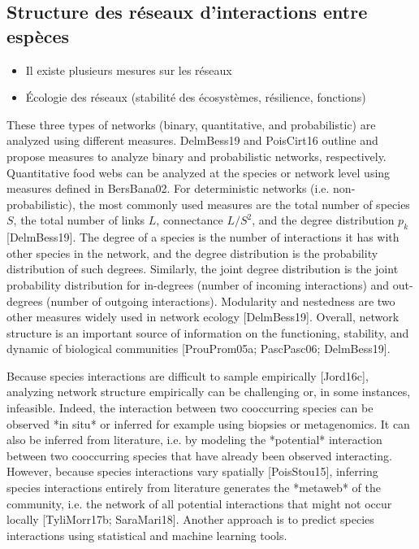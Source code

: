 \subsection{Structure des réseaux d'interactions entre espèces} 

\begin{itemize}
    \item Il existe plusieurs mesures sur les réseaux 
    \item Écologie des réseaux (stabilité des écosystèmes, résilience, fonctions)
\end{itemize}

These three types of networks (binary, quantitative, and probabilistic) are
analyzed using different measures. DelmBess19 and PoisCirt16 outline and
propose measures to analyze binary and probabilistic networks, respectively.
Quantitative food webs can be analyzed at the species or network level using
measures defined in BersBana02. For deterministic networks (i.e.
non-probabilistic), the most commonly used measures are the total number of
species $S$, the total number of links $L$, connectance $L/S^2$, and the degree
distribution $p_k$ [DelmBess19]. The degree of a species is the number of
interactions it has with other species in the network, and the degree
distribution is the probability distribution of such degrees. Similarly, the
joint degree distribution is the joint probability distribution for in-degrees
(number of incoming interactions) and out-degrees (number of outgoing
interactions). Modularity and nestedness are two other measures widely used in
network ecology [DelmBess19]. Overall, network structure is an important source
of information on the functioning, stability, and dynamic of biological
communities [ProuProm05a; PascPasc06; DelmBess19].

Because species interactions are difficult to sample empirically [Jord16c],
analyzing network structure empirically can be challenging or, in some
instances, infeasible. Indeed, the interaction between two cooccurring species
can be observed *in situ* or inferred for example using biopsies or
metagenomics. It can also be inferred from literature, i.e. by modeling the
*potential* interaction between two cooccurring species that have already been
observed interacting. However, because species interactions vary spatially
[PoisStou15], inferring species interactions entirely from literature generates
the *metaweb* of the community, i.e. the network of all potential interactions
that might not occur locally [TyliMorr17b; SaraMari18]. Another approach is to
predict species interactions using statistical and machine learning tools.

